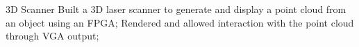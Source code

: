\project
    {3D Scanner}
    {
        Built a 3D laser scanner to generate and display a point cloud from an object using an FPGA;
        Rendered and allowed interaction with the point cloud through VGA output;
    }
